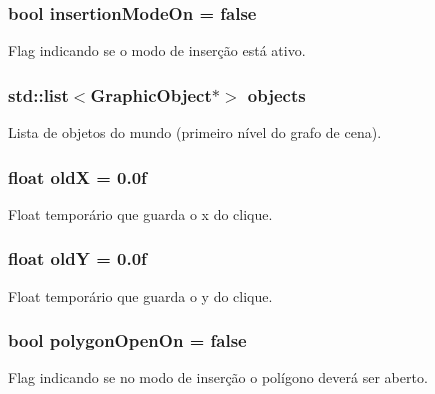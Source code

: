\subsubsection[{insertion\+Mode\+On}]{\setlength{\rightskip}{0pt plus 5cm}bool insertion\+Mode\+On = false}\label{group___world_gaf4135d5d26b2f98538dc661cfc50736f}
Flag indicando se o modo de inserção está ativo. \hypertarget{group___world_ga487a015c0da59fa4bf352c364579937a}{}
\subsubsection[{objects}]{\setlength{\rightskip}{0pt plus 5cm}std\+::list$<${\bf Graphic\+Object}$\ast$$>$ objects}\label{group___world_ga487a015c0da59fa4bf352c364579937a}
Lista de objetos do mundo (primeiro nível do grafo de cena). \hypertarget{group___world_gab71ed9ed9d554e0b59c5f3eea8a8b72c}{}
\subsubsection[{old\+X}]{\setlength{\rightskip}{0pt plus 5cm}float old\+X = 0.\+0f}\label{group___world_gab71ed9ed9d554e0b59c5f3eea8a8b72c}
Float temporário que guarda o x do clique. \hypertarget{group___world_ga4a7acfaba7bfffa91fd66ff56629bfe5}{}
\subsubsection[{old\+Y}]{\setlength{\rightskip}{0pt plus 5cm}float old\+Y = 0.\+0f}\label{group___world_ga4a7acfaba7bfffa91fd66ff56629bfe5}
Float temporário que guarda o y do clique. \hypertarget{group___world_ga9e0f70121f47c7b76983f4503d9e568c}{}
\subsubsection[{polygon\+Open\+On}]{\setlength{\rightskip}{0pt plus 5cm}bool polygon\+Open\+On = false}\label{group___world_ga9e0f70121f47c7b76983f4503d9e568c}
Flag indicando se no modo de inserção o polígono deverá ser aberto. \hypertarget{group___world_ga46a409c7a0b8f22f142780e936c75159}{}
